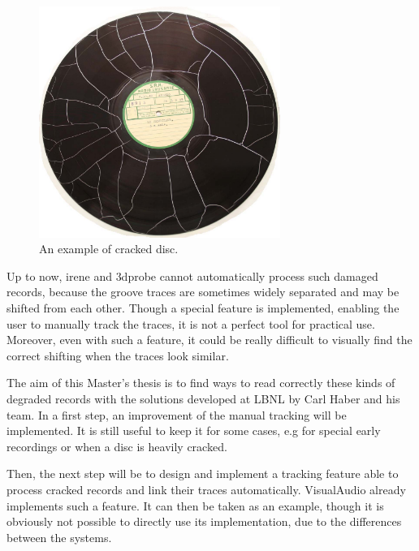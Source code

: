 \begin{figure}[!h]
\centering
\includegraphics[width=0.7\textwidth]{images/cracked-disc}
\caption{An example of cracked disc.}
\label{fig:crackeddisc}
\end{figure}

Up to now, \gls{irene} and \gls{3dprobe} cannot automatically process such damaged records, because the groove traces are sometimes widely separated and may be shifted from each other. Though a special feature is implemented, enabling the user to manually track the traces, it is not a perfect tool for practical use. Moreover, even with such a feature, it could be really difficult to visually find the correct shifting when the traces look similar.

The aim of this Master's thesis is to find ways to read correctly these kinds of degraded records with the solutions developed at LBNL by Carl Haber and his team. In a first step, an improvement of the manual tracking will be implemented. It is still useful to keep it for some cases, e.g for special early recordings or when a disc is heavily cracked.

Then, the next step will be to design and implement a tracking feature able to process cracked records and link their traces automatically. VisualAudio already implements such a feature. It can then be taken as an example, though it is obviously not possible to directly use its implementation, due to the differences between the systems.


